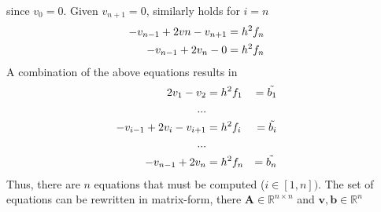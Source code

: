 \documentclass[%
oneside,                 %
final,                   %
10pt]{article}
\newcommand{\R}{\mathbb{R}}
\begin{document}
since $v_0=0$. Given $v_{n+1}=0$, similarly holds for $i=n$
\begin{equation*}
\begin{aligned}
  -v_{n-1}+2vn - v_{n+1}&= h^2f_n  \hspace{0.5cm} \\
 -v_{n-1}+ 2v_n - 0&= h^2f_n  \hspace{0.5cm} 
\end{aligned}
\end{equation*}
A combination of the above equations results in 
\begin{equation*}
\begin{aligned}
  2v_1 - v_{2}&= h^2f_1 & = \tilde{b_1}  \hspace{0.5cm} \\
  ...\\
  -v_{i-1}+2v_i - v_{i+1}&= h^2f_i &= \tilde{b_i}  \hspace{0.5cm} \\
  ...\\
 -v_{n-1}+ 2v_n &= h^2f_n &= \tilde{b_n}  \hspace{0.5cm} 
\end{aligned}
\end{equation*}
Thus, there are $n$ equations that must be computed ($i \in [1,n])$.
The set of equations can be rewritten in matrix-form, there $ \mathbf{A} \in \R^{n \times n} $ and $ \mathbf{v}, \mathbf{b} \in \R^{n}$
\end{document}
